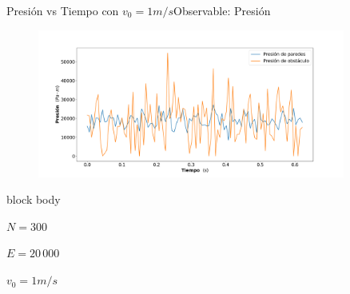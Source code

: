 \documentclass{beamer}
\begin{document}
            \begin{frame}{Presión vs Tiempo con $v_0=1m/s$}{Observable: Presión}
                    \begin{figure}[H!]
                        \includegraphics[width=0.9\textwidth]{./pressure_vs_time_1}
                        \label{fig:p_1}
                    \end{figure}
                    \begin{beamercolorbox}[sep=5pt,center]{block body}
                        \begin{minipage}[t]{0.3\textwidth}
                            \centering
                            \small{$N=300$}
                        \end{minipage}
                        \hfill
                        \begin{minipage}[t]{0.3\textwidth}
                            \centering
                            \small{$E=20\,000$}
                        \end{minipage}
                        \hfill
                        \begin{minipage}[t]{0.3\textwidth}
                            \centering
                            \small{$v_0 = 1 m/s$}
                        \end{minipage}
                    \end{beamercolorbox}
            \end{frame}
\end{document}
